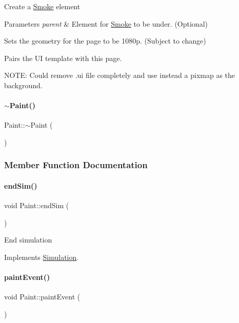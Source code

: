 Create a \mbox{\hyperlink{classSmoke}{Smoke}} element 
\begin{DoxyParams}{Parameters}
{\em parent} & Element for \mbox{\hyperlink{classSmoke}{Smoke}} to be under. (Optional)\\
\hline
\end{DoxyParams}
Sets the geometry for the page to be 1080p. (Subject to change)

Pairs the UI template with this page.

N\+O\+TE\+: Could remove .ui file completely and use instead a pixmap as the background. \mbox{\label{classPaint_ad9e9b7084b28e84887c70d0e4540ddb8}} 
\paragraph{\texorpdfstring{$\sim$Paint()}{~Paint()}}
{\footnotesize\ttfamily Paint\+::$\sim$\+Paint (\begin{DoxyParamCaption}{ }\end{DoxyParamCaption})}



\subsubsection{Member Function Documentation}
\mbox{\label{classPaint_a0624eaeb1d076ab01278b27026aba249}} 
\paragraph{\texorpdfstring{endSim()}{endSim()}}
{\footnotesize\ttfamily void Paint\+::end\+Sim (\begin{DoxyParamCaption}{ }\end{DoxyParamCaption})\hspace{0.3cm}{\ttfamily [virtual]}}

End simulation 

Implements \mbox{\hyperlink{classSimulation_ab496d124202f55e741db7db9a304a7ee}{Simulation}}.

\mbox{\label{classPaint_a93538df552b492f35b5349c9c546707f}} 
\paragraph{\texorpdfstring{paintEvent()}{paintEvent()}}
{\footnotesize\ttfamily void Paint\+::paint\+Event (\begin{DoxyParamCaption}\item[{Q\+Paint\+Event $\ast$}]{ }\end{DoxyParamCaption})}

